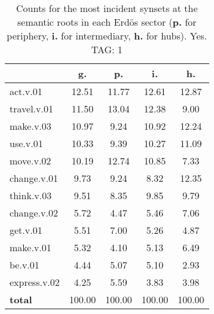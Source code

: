 \begin{table}[h!]
\begin{center}
\begin{tabular}{| l || c | c | c | c |}\hline
 & {\bf g.} & {\bf p.} & {\bf i.} & {\bf h.} \\\hline\hline
act.v.01 & 12.51  & 11.77  & 12.61  & 12.87 \\\hline
travel.v.01 & 11.50  & 13.04  & 12.38  & 9.00 \\\hline
make.v.03 & 10.97  & 9.24  & 10.92  & 12.24 \\\hline
use.v.01 & 10.33  & 9.39  & 10.27  & 11.09 \\\hline
move.v.02 & 10.19  & 12.74  & 10.85  & 7.33 \\\hline
change.v.01 & 9.73  & 9.24  & 8.32  & 12.35 \\\hline
think.v.03 & 9.51  & 8.35  & 9.85  & 9.79 \\\hline
change.v.02 & 5.72  & 4.47  & 5.46  & 7.06 \\\hline
get.v.01 & 5.51  & 7.00  & 5.26  & 4.87 \\\hline
make.v.01 & 5.32  & 4.10  & 5.13  & 6.49 \\\hline
be.v.01 & 4.44  & 5.07  & 5.10  & 2.93 \\\hline
express.v.02 & 4.25  & 5.59  & 3.83  & 3.98 \\\hline\hline
{{\bf total}} & 100.00  & 100.00  & 100.00  & 100.00 \\\hline
\end{tabular}
\caption{Counts for the most incident synsets at the semantic roots in each Erd\"os sector ({\bf p.} for periphery, {\bf i.} for intermediary, {\bf h.} for hubs). Yes. TAG: 1}
\end{center}
\end{table}